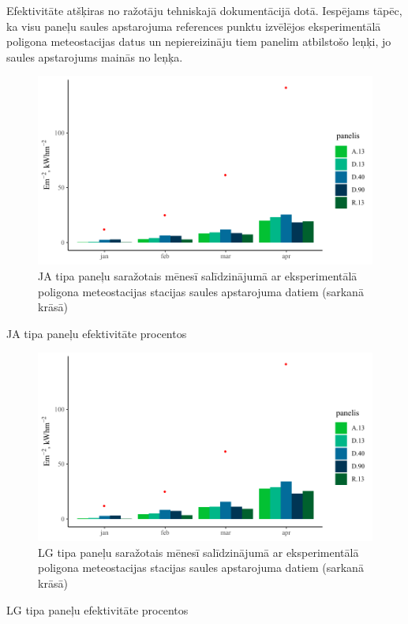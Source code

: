 Efektivitāte atšķiras no ražotāju tehniskajā dokumentācijā dotā. Iespējams tāpēc, ka visu paneļu saules apstarojuma references punktu izvēlējos eksperimentālā poligona meteostacijas datus un nepiereizināju tiem panelim atbilstošo leņķi, jo saules apstarojums mainās no leņķa.
\begin{figure}[h]
    \centering
    \includegraphics[width=\linewidth]{figures/results/ja_m2.pdf}
    \caption{JA tipa paneļu saražotais mēnesī salīdzinājumā ar eksperimentālā poligona meteostacijas stacijas saules apstarojuma datiem (sarkanā krāsā)}
    \label{fig:ja}
\end{figure}
\begin{table}[h]
    \caption{JA tipa paneļu efektivitāte procentos}
    \begin{center}
    
    \end{center}
    \label{tab:JA_eff}
\end{table}

\begin{figure}[h]
    \centering
    \includegraphics[width=\linewidth]{figures/results/lg_m2.pdf}
    \caption{LG tipa paneļu saražotais mēnesī salīdzinājumā ar eksperimentālā poligona meteostacijas stacijas saules apstarojuma datiem (sarkanā krāsā)}
    \label{fig:lg}
\end{figure}
\begin{table}[h]
    \caption{LG tipa paneļu efektivitāte procentos}
    \begin{center}
    
    \end{center}
    \label{tab:LG_eff}
\end{table}



